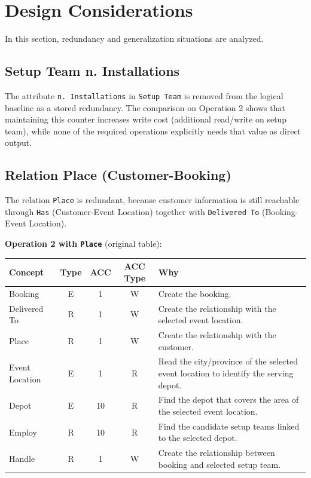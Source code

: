 \section*{Design Considerations}

In this section, redundancy and generalization situations are analyzed.

\subsection*{Setup Team n. Installations}

The attribute \texttt{n. Installations} in \texttt{Setup Team} is removed from the logical baseline as a stored redundancy. The comparison on Operation 2 shows that maintaining this counter increases write cost (additional read/write on setup team), while none of the required operations explicitly needs that value as direct output.

\subsection*{Relation Place (Customer-Booking)}

The relation \texttt{Place} is redundant, because customer information is still reachable through \texttt{Has} (Customer-Event Location) together with \texttt{Delivered To} (Booking-Event Location).

\textbf{Operation 2 with \texttt{Place}} (original table):

\begin{table}[H]
    \centering
    \begin{tabular}{|l|c|c|c|p{6.3cm}|}
    \hline
    \textbf{Concept} & \textbf{Type} & \textbf{ACC} & \textbf{ACC Type} & \textbf{Why} \\
    \hline
    Booking & E & 1 & W & Create the booking. \\
    \hline
    Delivered To & R & 1 & W & Create the relationship with the selected event location. \\
    \hline
    Place & R & 1 & W & Create the relationship with the customer. \\
    \hline
    Event Location & E & 1 & R & Read the city/province of the selected event location to identify the serving depot. \\
    \hline
    Depot & E & 10 & R & Find the depot that covers the area of the selected event location. \\
    \hline
    Employ & R & 10 & R & Find the candidate setup teams linked to the selected depot. \\
    \hline
    Handle & R & 1 & W & Create the relationship between booking and selected setup team. \\
    \hline
    \end{tabular}
\end{table}

